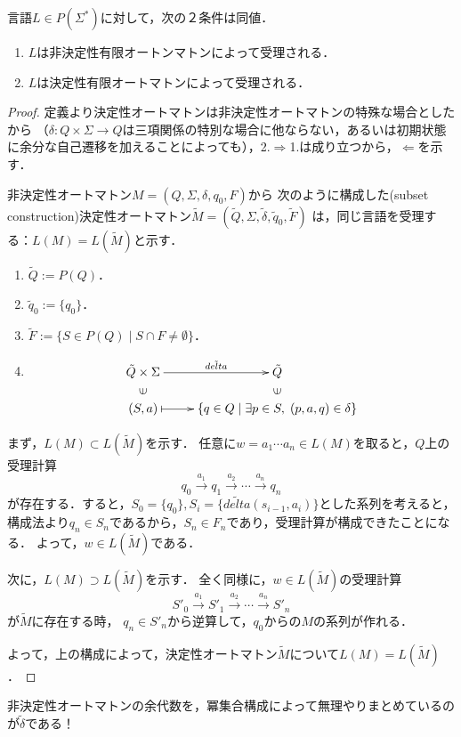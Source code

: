 \documentclass[uplatex, dvipdfmx]{jsreport}
\begin{document}
\begin{theorem}[非決定性有限オートマトンと決定性有限オートマトンの等価性]
    言語$L\in P(\Sigma^*)$に対して，次の２条件は同値．
    \begin{enumerate}
        \item $L$は非決定性有限オートンマトンによって受理される．
        \item $L$は決定性有限オートマトンによって受理される．
    \end{enumerate}
\end{theorem}
\begin{proof}
    定義より決定性オートマトンは非決定性オートマトンの特殊な場合としたから
    （$\delta:Q\times\Sigma\to Q$は三項関係の特別な場合に他ならない，あるいは初期状態に余分な自己遷移を加えることによっても），2.$\Rightarrow$1.は成り立つから，$\Leftarrow$を示す．

    非決定性オートマトン$M=(Q,\Sigma,\delta,q_0,F)$から
    次のように構成した(subset construction)決定性オートマトン$\tilde{M}=(\tilde{Q},\Sigma,\tilde{\delta},\tilde{q}_0,\tilde{F})$
    は，同じ言語を受理する：$L(M)=L(\tilde{M})$と示す．
    \begin{enumerate}
        \item $\tilde{Q}:=P(Q)$．
        \item $\tilde{q}_0:=\{q_0\}$．
        \item $\tilde{F}:=\{S\in P(Q)\mid S\cap F\ne\emptyset\}$．
        \item \[\xymatrix@R-2pc{
            \tilde{Q}\times\Sigma\ar[r]^-{\tilde{delta}}&\tilde{Q}\\
            \rotatebox[origin=c]{90}{$\in$}&\rotatebox[origin=c]{90}{$\in$}\\
            (S,a)\ar@{|->}[r]&\{q\in Q\mid\exists p\in S,\;(p,a,q)\in\delta\}
        }\]
    \end{enumerate}
    まず，$L(M)\subset L(\tilde{M})$を示す．
    任意に$w=a_1\cdots a_n\in L(M)$を取ると，$Q$上の受理計算
    \[ q_0\xrightarrow{a_1}q_1\xrightarrow{a_2}\cdots\xrightarrow{a_n}q_n \]
    が存在する．すると，$S_0=\{q_0\},S_i=\{\tilde{delta}(s_{i-1},a_i)\}$とした系列を考えると，構成法より$q_n\in S_n$であるから，$S_n\in F_n$であり，受理計算が構成できたことになる．
    よって，$w\in L(\tilde{M})$である．

    次に，$L(M)\supset L(\tilde{M})$を示す．
    全く同様に，$w\in L(\tilde{M})$の受理計算
    \[S'_0\xrightarrow{a_1}S'_1\xrightarrow{a_2}\cdots\xrightarrow{a_n}S'_n\]
    が$\tilde{M}$に存在する時，
    $q_n\in S'_n$から逆算して，$q_0$からの$M$の系列が作れる．

    よって，上の構成によって，決定性オートマトン$\tilde{M}$について$L(M)=L(\tilde{M})$．
\end{proof}
\begin{remark}
    非決定性オートマトンの余代数を，冪集合構成によって無理やりまとめているのが$\tilde{\delta}$である！
\end{remark}
\end{document}
